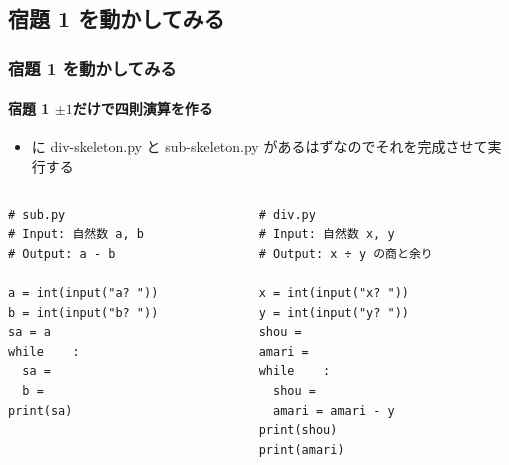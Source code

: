 \subsection{宿題 1 を動かしてみる}
\begin{frame}
\frametitle{宿題 1 を動かしてみる}
\framesubtitle{宿題 1 \textendash $\pm 1$だけで四則演算を作る}
  \begin{itemize}
\item \href{https://sites.google.com/presystems.xyz/elementarycs/top}{} に div-skeleton.py と sub-skeleton.py があるはずなのでそれを完成させて実行する
  \end{itemize}
  \begin{columns}
    \begin{column}{0.45\textwidth}
      \begin{lstlisting}[caption={sub.py},label=lst:sub]
# sub.py
# Input: 自然数 a, b
# Output: a - b

a = int(input("a? "))
b = int(input("b? "))
sa = a               
while    :
  sa = 
  b = 
print(sa)
      \end{lstlisting}
    \end{column}
    \begin{column}{0.45\textwidth}
      \begin{lstlisting}[caption={div.py},label=lst:div]
# div.py
# Input: 自然数 x, y
# Output: x ÷ y の商と余り

x = int(input("x? "))
y = int(input("y? "))
shou = 
amari = 
while    :
  shou = 
  amari = amari - y
print(shou)
print(amari)
      \end{lstlisting}
    \end{column}
  \end{columns}
\end{frame}
